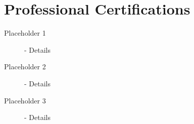 \documentclass[a4paper]{article}
\begin{document}
\section{Professional Certifications}

\begin{description}
\item[Placeholder 1] - Details
\item[Placeholder 2] - Details
\item[Placeholder 3] - Details
\end{description}
\end{document}

